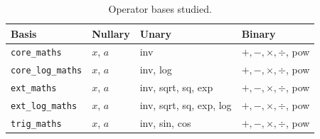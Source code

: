 \documentclass[preprint,12pt,authoryear]{elsarticle}
\newcommand{\Fleq}{\mathcal{F}_{\leq k}}
\newcommand{\hd}[1]{{\color{red}\textbf{[HD: #1]}}}
\begin{document}
\begin{table}[t]
\centering
\caption{Operator bases studied.}
\label{tab:bases}
\begin{tabular}{llll}
\toprule
Basis & Nullary & Unary & Binary \\
\midrule
\texttt{core\_maths}    & $x$, $a$ & inv & $+, -, \times, \div$, pow \\
\texttt{core\_log\_maths} & $x$, $a$ & inv, log & $+, -, \times, \div$, pow \\ %
\texttt{ext\_maths}     & $x$, $a$ & inv, sqrt, sq, exp & $+, -, \times, \div$, pow \\
\texttt{ext\_log\_maths} & $x$, $a$ & inv, sqrt, sq, exp, log & $+, -, \times, \div$, pow \\
\texttt{trig\_maths}     & $x$, $a$ & inv, sin, cos & $+, -, \times, \div$, pow \\
\bottomrule
\end{tabular}
\end{table}


\end{document}
